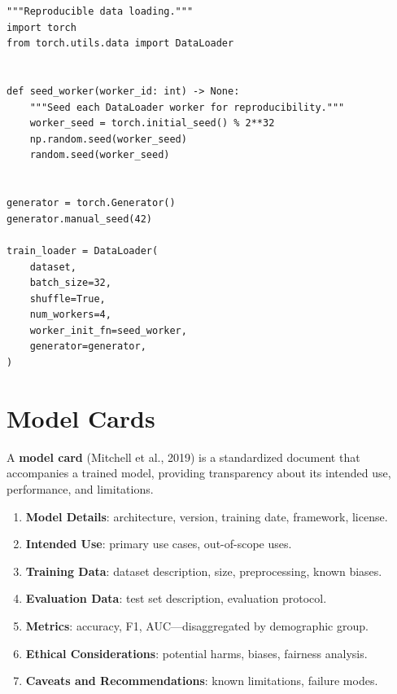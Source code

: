 \begin{codeblock}[title=\textbf{Deterministic DataLoader}]
\begin{verbatim}
"""Reproducible data loading."""
import torch
from torch.utils.data import DataLoader


def seed_worker(worker_id: int) -> None:
    """Seed each DataLoader worker for reproducibility."""
    worker_seed = torch.initial_seed() % 2**32
    np.random.seed(worker_seed)
    random.seed(worker_seed)


generator = torch.Generator()
generator.manual_seed(42)

train_loader = DataLoader(
    dataset,
    batch_size=32,
    shuffle=True,
    num_workers=4,
    worker_init_fn=seed_worker,
    generator=generator,
)
\end{verbatim}
\end{codeblock}

\section{Model Cards}
\label{sec:model-cards}

A \textbf{model card} (Mitchell et al., 2019) is a
standardized document that accompanies a trained model, providing
transparency about its intended use, performance, and limitations.

\begin{keyformulas}[title=\textbf{Model card template}]
\begin{enumerate}
  \item \textbf{Model Details}: architecture, version, training date,
    framework, license.
  \item \textbf{Intended Use}: primary use cases, out-of-scope uses.
  \item \textbf{Training Data}: dataset description, size,
    preprocessing, known biases.
  \item \textbf{Evaluation Data}: test set description, evaluation
    protocol.
  \item \textbf{Metrics}: accuracy, F1, AUC---disaggregated by
    demographic group.
  \item \textbf{Ethical Considerations}: potential harms, biases,
    fairness analysis.
  \item \textbf{Caveats and Recommendations}: known limitations,
    failure modes.
\end{enumerate}
\end{keyformulas}

